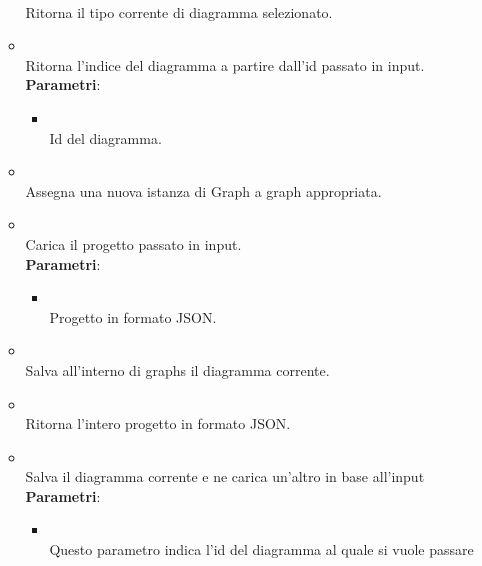 \begin{itemize}
\begin{itemize}
\\ Ritorna il tipo corrente di diagramma selezionato.
\item {}
\\ Ritorna l'indice del diagramma a partire dall'id passato in input.
\\ \textbf{Parametri}:
\begin{itemize}
\item {}
\\ Id del diagramma.
\end{itemize}
\item {}
\\ Assegna una nuova istanza di Graph a graph appropriata.
\item {}
\\ Carica il progetto passato in input.
\\ \textbf{Parametri}:
\begin{itemize}
\item {}
\\ Progetto in formato JSON.
\end{itemize}
\item {}
\\ Salva all'interno di graphs il diagramma corrente.
\item {}
\\ Ritorna l'intero progetto in formato JSON. %
\item {}
\\ Salva il diagramma corrente e ne carica un'altro in base all'input
\\ \textbf{Parametri}:
\begin{itemize}
\item {}
\\ Questo parametro indica l'id del diagramma al quale si vuole passare
\end{itemize}
\end{itemize}
\end{itemize}
\subsection{}
\label{\nogloxy{swedesigner::client::model::celltypes}}

